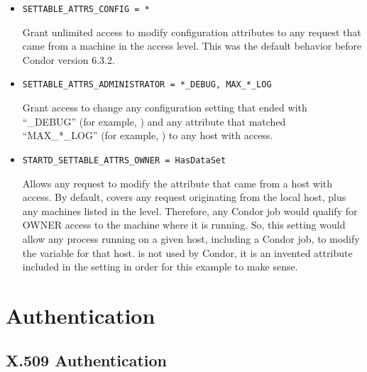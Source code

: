 \begin{itemize}

\item \begin{verbatim}SETTABLE_ATTRS_CONFIG = *\end{verbatim}
Grant unlimited access to modify configuration attributes
to any request that came from a machine in the  access
level. 
This was the default behavior before Condor version 6.3.2.

\item \begin{verbatim}SETTABLE_ATTRS_ADMINISTRATOR = *_DEBUG, MAX_*_LOG\end{verbatim} 
Grant access to change any configuration setting that ended
with ``\_DEBUG'' (for example, ) and any
attribute that matched ``MAX\_*\_LOG'' (for example,
) to any host with 
access. 

\item \begin{verbatim}STARTD_SETTABLE_ATTRS_OWNER = HasDataSet\end{verbatim}
Allows any request to modify the  
attribute that came from a host with  access.
By default,  covers any request originating from the
local host, plus any machines listed in the 
level.
Therefore, any Condor job would qualify for OWNER access to the
machine where it is running. 
So, this setting would allow any process running on a given host,
including a Condor job, to modify the  variable for
that host. 
 is not used by Condor, it is an invented attribute
included in the  setting in order for this
example to make sense.

\end{itemize}


\section{\label{sec:Authentication}Authentication}
\Todo

\subsection{\label{sec:X509-Authentication}X.509 Authentication}
\Todo

